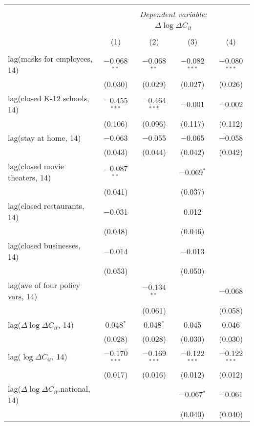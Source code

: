 \begin{tabular}{@{\extracolsep{1pt}}lcccc} 
\\[-1.8ex]\hline 
\hline \\[-1.8ex] 
 & \multicolumn{4}{c}{\textit{Dependent variable:}} \\ 
\cline{2-5} 
 & \multicolumn{4}{c}{$\Delta \log \Delta C_{it}$} \\ 
\\[-1.8ex] & (1) & (2) & (3) & (4)\\ 
\hline \\[-1.8ex] 
 lag(masks for employees, 14) & $-$0.068$^{**}$ & $-$0.068$^{**}$ & $-$0.082$^{***}$ & $-$0.080$^{***}$ \\ 
  & (0.030) & (0.029) & (0.027) & (0.026) \\ 
  lag(closed K-12 schools, 14) & $-$0.455$^{***}$ & $-$0.464$^{***}$ & $-$0.001 & $-$0.002 \\ 
  & (0.106) & (0.096) & (0.117) & (0.112) \\ 
  lag(stay at home, 14) & $-$0.063 & $-$0.055 & $-$0.065 & $-$0.058 \\ 
  & (0.043) & (0.044) & (0.042) & (0.042) \\ 
  lag(closed movie theaters, 14) & $-$0.087$^{**}$ &  & $-$0.069$^{*}$ &  \\ 
  & (0.041) &  & (0.037) &  \\ 
  lag(closed restaurants, 14) & $-$0.031 &  & 0.012 &  \\ 
  & (0.048) &  & (0.046) &  \\ 
  lag(closed businesses, 14) & $-$0.014 &  & $-$0.013 &  \\ 
  & (0.053) &  & (0.050) &  \\ 
  lag(ave of four policy vars, 14) &  & $-$0.134$^{**}$ &  & $-$0.068 \\ 
  &  & (0.061) &  & (0.058) \\ 
  lag($\Delta \log \Delta C_{it}$, 14) & 0.048$^{*}$ & 0.048$^{*}$ & 0.045 & 0.046 \\ 
  & (0.028) & (0.028) & (0.030) & (0.030) \\ 
  lag($\log \Delta C_{it}$, 14) & $-$0.170$^{***}$ & $-$0.169$^{***}$ & $-$0.122$^{***}$ & $-$0.122$^{***}$ \\ 
  & (0.017) & (0.016) & (0.012) & (0.012) \\ 
  lag($\Delta \log \Delta C_{it}$.national, 14) &  &  & $-$0.067$^{*}$ & $-$0.061 \\ 
  &  &  & (0.040) & (0.040) \\ 

\end{tabular}
